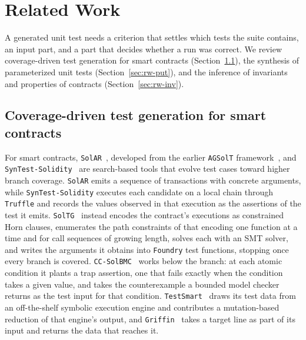 \documentclass[manuscript,anonymous]{acmart}
\newcommand{\tool}[1]{\texttt{#1}}
\begin{document}
\section{Related Work}\label{sec:related}

A generated unit test needs a criterion that settles which tests the suite
contains, an input part, and a part that decides whether a run was correct. We
review coverage-driven test generation for smart contracts
(Section~\ref{sec:rw-cov}), the synthesis of parameterized unit tests
(Section~\ref{sec:rw-put}), and the inference of invariants and properties of
contracts (Section~\ref{sec:rw-inv}).

\subsection{Coverage-driven test generation for smart contracts}\label{sec:rw-cov}

For smart contracts, \tool{SolAR}~\cite{solar_sbst}, developed from the earlier
\tool{AGSolT} framework~\cite{agsolt}, and
\tool{SynTest-Solidity}~\cite{syntest_solidity} are search-based tools that
evolve test cases toward higher branch coverage. \tool{SolAR} emits a sequence
of transactions with concrete arguments, while \tool{SynTest-Solidity} executes
each candidate on a local chain through \tool{Truffle} and records the values
observed in that execution as the assertions of the test it emits.
\tool{SolTG}~\cite{SolTG-1} instead encodes the contract's executions as
constrained Horn clauses, enumerates the path constraints of that encoding one
function at a time and for call sequences of growing length, solves each with
an SMT solver, and writes the arguments it obtains into \tool{Foundry} test
functions, stopping once every branch is covered. \tool{CC-SolBMC}~\cite{CCSolBMC2024}
works below the branch: at each atomic condition it plants a trap assertion,
one that fails exactly when the condition takes a given value, and takes the
counterexample a bounded model checker returns as the test input for that
condition. \tool{TestSmart}~\cite{TestSmart2021} draws its
test data from an off-the-shelf symbolic execution engine and contributes a
mutation-based reduction of that engine's output, and
\tool{Griffin}~\cite{Griffin2024} takes a target line as part of its input and
returns the data that reaches it.
\end{document}
